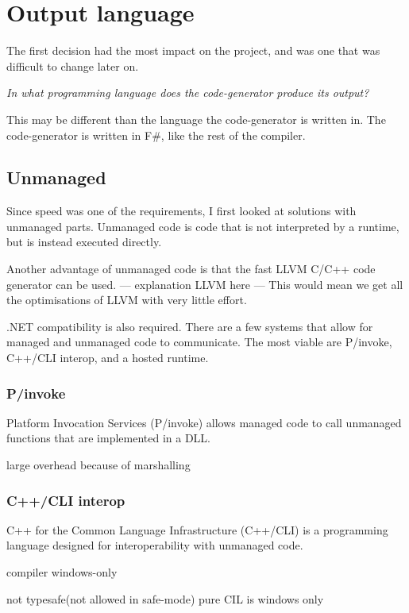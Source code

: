 \section{Output language}
The first decision had the most impact on the project, and was one that was difficult to change later on.

\textit{In what programming language does the code-generator produce its output?}

This may be different than the language the code-generator is written in.
The code-generator is written in F\#, like the rest of the compiler.

\subsection{Unmanaged}
Since speed was one of the requirements, I first looked at solutions with unmanaged parts.
Unmanaged code is code that is not interpreted by a runtime, but is instead executed directly.

Another advantage of unmanaged code is that the fast LLVM C/C++ code generator can be used.
--- explanation LLVM here ---
This would mean we get all the optimisations of LLVM with very little effort.

.NET compatibility is also required.
There are a few systems that allow for managed and unmanaged code to communicate.
The most viable are P/invoke, C++/CLI interop, and a hosted runtime.

\subsubsection*{P/invoke}
Platform Invocation Services (P/invoke) allows managed code to call unmanaged functions that are implemented in a DLL.\cite{msdn_pinvoke}

large overhead because of marshalling \cite{msdn_interop_performance}

\subsubsection*{C++/CLI interop}
C++ for the Common Language Infrastructure (C++/CLI) is a programming language designed for interoperability with unmanaged code.%

compiler windows-only\cite{mono_c++cli}

not typesafe(not allowed in safe-mode) pure CIL is windows only\cite{mono_c++cli}

